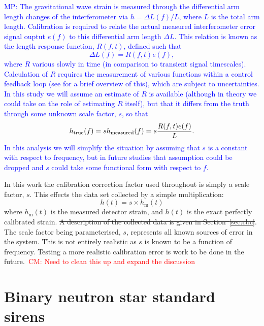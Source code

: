 \documentclass[12pt]{iopart}
\newcommand{\cm}[1]{\textcolor{red}{CM: #1}}
\newcommand{\MP}[1]{\textcolor{blue}{MP: #1}}
\begin{document}
\MP{The gravitational wave strain is measured through the differential arm length changes
of the interferometer via $h = \Delta L(f) / L$, where $L$ is the total arm length.
Calibration is required to relate the actual measured interferometer error signal ouptut
$e(f)$ to this differential arm length $\Delta L$. This relation
is known as the length response function, $R(f,t)$, defined such that
\begin{equation}
\Delta L(f) = R(f,t) e(f),
\end{equation}
where $R$ various slowly in time (in comparison to transient signal timescales).
Calculation of $R$ requires the measurement of various functions within a control feedback loop
(see \cite{Vitale:2012} for a brief overview of this), which are subject to
uncertainties. In this study we will assume an estimate of $R$ is available (although
in theory we could take on the role of estimating $R$ itself), but that it differs from the
truth through some unknown scale factor, $s$, so that
\begin{equation}
h_{\rm true}(f) = s h_{\rm measured}(f) = s \frac{R(f,t) e(f)}{L}.
\end{equation}
In this analysis we will simplify the situation by assuming that $s$ is a constant with
respect to frequency, but in future studies that assumption could be dropped and $s$
could take some functional form with respect to $f$.
}

In this work the calibration correction factor used throughout is simply a scale
factor, $s$. This effects the data set collected by a simple multiplication:
%
\begin{equation}\label{eq:scaledata}
  h(t) = s\times h_{\mathrm{m}}(t)
\end{equation}
%
where $h_{\mathrm{m}}(t)$ is the measured detector strain, and
$h(t)$ is the exact perfectly calibrated strain. \sout{A description of the
collected data is given in Section~\ref{sec:cbc}}. The scale factor being
parameterised, $s$, represents all known sources of error in the system. This
is not entirely realistic as $s$ is known to be a function of frequency.
Testing a more realistic calibration error is work to be done in the
future.~\cm{Need to clean this up and expand the discussion}

\section{Binary neutron star standard sirens\label{sec:sirens}}
\end{document}

